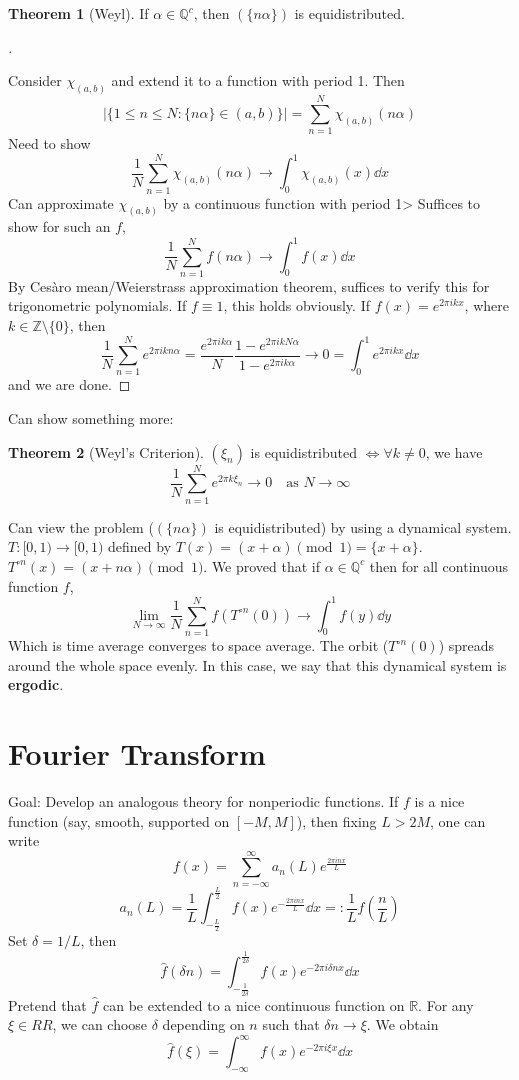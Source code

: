 \documentclass{article}
\theoremstyle{definition}
\newtheorem{thm}{Theorem}
\newenvironment{proofs}[1][\proofname]{%
  \begin{proof}[#1]$ $\par\nobreak\ignorespaces
}{%
  \end{proof}
}
\newcommand{\QQ}{\mathbb Q}
\newcommand{\RR}{\mathbb R}
\newcommand{\ZZ}{\mathbb Z}
\newcommand{\Lra}{\Leftrightarrow}
\begin{document}
\begin{thm}[Weyl]
	If $\alpha \in \QQ^c$, then $(\{n \alpha\})$ is equidistributed.
\end{thm}

\begin{proofs}
	Consider $\chi_{(a, b)}$ and extend it to a function with period 1.
	Then
	\[
		|\{1 \leq n \leq N: \{n \alpha\} \in (a, b)\}| = \sum_{n = 1}^N \chi_{(a, b)}(n \alpha)
	\]
	Need to show
	\[
		\frac{1}{N} \sum_{n = 1}^N \chi_{(a, b)}(n \alpha) \to \int_0^1 \chi_{(a, b)}(x) \dd{x}
	\]
	Can approximate $\chi_{(a, b)}$ by a continuous function with period 1>
	Suffices to show for such an $f$, 
	\[
		\frac{1}{N} \sum_{n = 1}^N f(n \alpha) \to \int_0^1 f(x) \dd{x}
	\]
	By Ces\`aro mean/Weierstrass approximation theorem, suffices to verify this for trigonometric polynomials.
	If $f \equiv 1$, this holds obviously.
	If $f(x) = e^{2 \pi i kx}$, where $k \in \ZZ \setminus \{0\}$, then
	\[
		\frac{1}{N} \sum_{n = 1}^N e^{2 \pi i kn \alpha} = \frac{e^{2 \pi i k \alpha}}{N} \frac{1 - e^{2 \pi  i k N \alpha}}{1 - e^{2 \pi i k \alpha}} \to 0 = \int_0^1 e^{2 \pi i k x} \dd{x}
	\]
	and we are done.
\end{proofs}

Can show something more:

\begin{thm}[Weyl's Criterion]
	$(\xi_n)$ is equidistributed $\Lra \forall k \neq 0$, we have
	\[
		\frac{1}{N} \sum_{n = 1}^N e^{2 \pi k \xi_n} \to 0 \quad \text{as }N \to \infty
	\]
\end{thm}

Can view the problem ($(\{n\alpha\})$ is equidistributed) by using a dynamical system.
$T:[0, 1) \to [0, 1)$ defined by $T(x) = (x + \alpha) \pmod{1} = \{x + \alpha\}$.
$T^{\circ n}(x) = (x + n \alpha) \pmod{1}$.
We proved that if $\alpha \in \QQ^c$ then for all continuous function $f$, 
\[
	\lim_{N \to \infty} \frac{1}{N} \sum_{n = 1}^N f( T^{\circ n}(0)) \to \int_0^1 f(y) \dd{y}
\]
Which is time average converges to space average.
The orbit ($T^{\circ n}(0)$) spreads around the whole space evenly.
In this case, we say that this dynamical system is \textbf{ergodic}. 

\section{Fourier Transform}

Goal: Develop an analogous theory for nonperiodic functions.
If $f$ is a nice function (say, smooth, supported on $[-M, M]$), then fixing $L > 2M$, one can write
\[
	f(x) = \sum_{n = -\infty}^\infty a_n(L) e^{ \frac{2 \pi i n x}{L}}
\]
\[
	a_n(L) = \frac{1}{L} \int_{-\frac{L}{2}}^{\frac{L}{2}} f(x) e^{-\frac{2 \pi i n x}{L}} \dd{x} =: \frac{1}{L} \widehat{f} \left( \frac{n}{L} \right)
\]
Set $\delta = 1/L$, then
\[
	\widehat{f}(\delta n) = \int_{- \frac{1}{2 \delta}}^{\frac{1}{2 \delta}} f(x) e^{- 2 \pi i \delta n x} \dd{x}
\]
Pretend that $\widehat{f}$ can be extended to a nice continuous function on $\RR$.
For any $\xi \in RR$, we can choose $\delta$ depending on $n$ such that $\delta n \to \xi$.
We obtain
\[
	\widehat{f}(\xi) = \int_{- \infty}^\infty f(x) e^{- 2 \pi i \xi x} \dd{x}
\]
\end{document}

